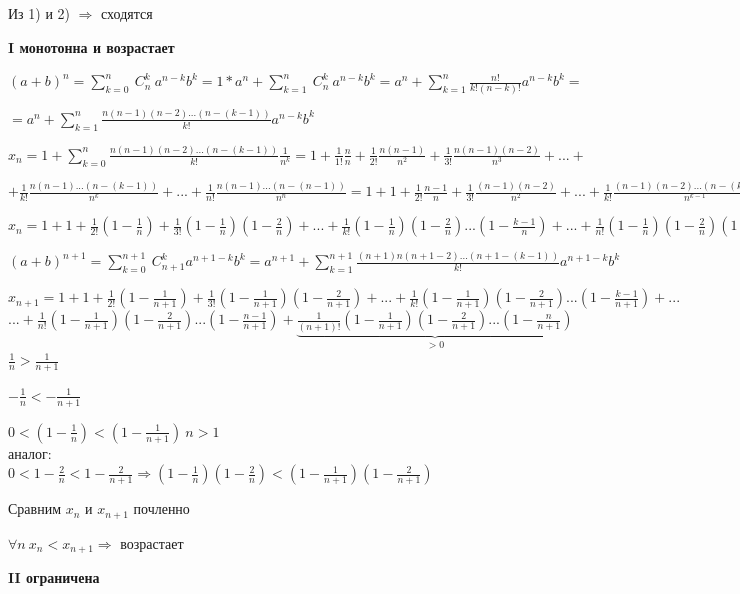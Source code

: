 \documentclass{article}
\begin{document}
    Из 1) и 2) \( \Rightarrow \) сходятся

    \textbf{I монотонна и возрастает}

    \((a+b)^n = \sum_{k=0}^n\ C^k_n \ a^{n-k}b^k=1*a^n+\sum_{k=1}^n\ C^k_n \ a^{n-k}b^k = a^n+\sum_{k=1}^n \frac{n!}{k!(n-k)!} a^{n-k}b^k = \)

    \( = a^n + \sum_{k=1}^n \frac{n(n-1)(n-2)...(n-(k-1))}{k!} a^{n-k} b^k\)

    \( x_n = 1 + \sum_{k=0}^n \frac{n(n-1)(n-2)...(n-(k-1))}{k!} \frac{1}{n^k} = 1 + \frac{1}{1!} \frac{n}{n} + \frac{1}{2!} \frac{n(n-1)}{n^2} + \frac{1}{3!} \frac{n(n-1)(n-2)}{n^3} + ... + \)

    \( + \frac{1}{k!} \frac{n(n-1)...(n-(k-1))}{n^k} + ... + \frac{1}{n!} \frac{n(n-1)...(n-(n-1))}{n^n} = 1 + 1 + \frac{1}{2!} \frac{n-1}{n} + \frac{1}{3!} \frac{(n-1)(n-2)}{n^2} + ... + \frac{1}{k!} \frac{(n-1)(n-2)...(n-(k-1))}{n^{k-1}} + ... +\)

    \(x_n = 1+1+\frac{1}{2!}(1-\frac{1}{n})+\frac{1}{3!}(1-\frac{1}{n})(1-\frac{2}{n})+...+\frac{1}{k!}(1-\frac{1}{n})(1-\frac{2}{n})...(1-\frac{k-1}{n}) + ... + \frac{1}{n!} (1 - \frac{1}{n})(1 - \frac{2}{n})(1 - \frac{n-1}{n})\)

    \((a+b)^{n+1} = \sum_{k=0}^{n+1}\ C_{n+1}^k a^{n+1-k} b^k = a^{n+1} + \sum_{k=1}^{n+1} \frac{(n+1)n(n+1-2)...(n+1-(k-1))}{k!} a^{n+1-k} b^k\)

    \(x_{n+1} = 1 + 1 + \frac{1}{2!}(1-\frac{1}{n+1}) + \frac{1}{3!}(1-\frac{1}{n+1})(1-\frac{2}{n+1})+...+\frac{1}{k!}(1-\frac{1}{n+1})(1-\frac{2}{n+1})...(1-\frac{k-1}{n+1})+...\)\\
    \(...+\frac{1}{n!}(1-\frac{1}{n+1})(1-\frac{2}{n+1})...(1-\frac{n-1}{n+1}) + \underbrace{\frac{1}{(n+1)!}(1-\frac{1}{n+1})(1-\frac{2}{n+1})...(1-\frac{n}{n+1})}_{> 0}\)\\

    \(\frac{1}{n} > \frac{1}{n+1}\)

    \(-\frac{1}{n} < -\frac{1}{n+1}\)

    \(0 < (1-\frac{1}{n}) < (1-\frac{1}{n+1})\ n > 1\) 
    \\аналог: \\\(0 < 1-\frac{2}{n} < 1-\frac{2}{n+1} \Rightarrow (1-\frac{1}{n})(1-\frac{2}{n}) < (1 - \frac{1}{n+1})(1 - \frac{2}{n+1})\)
    
    Сравним \(x_n\) и \(x_{n+1}\) почленно
    
    \(\forall n \ x_n < x_{n+1} \Rightarrow\) возрастает

    \textbf{II ограничена}
\end{document}
